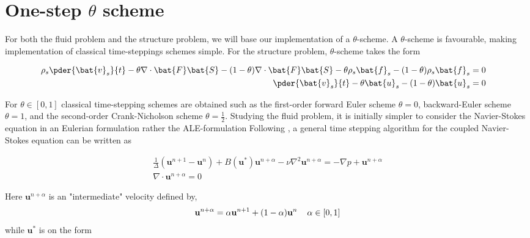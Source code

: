 \section{One-step $\theta$ scheme} 
For both the fluid problem and the structure problem, we will base our implementation of a $\theta$-scheme.  A $\theta$-scheme is favourable, making implementation of classical time-steppings schemes simple. For the structure problem,  $\theta$-scheme takes the form

\begin{align*}
\rho_s \pder{\bat{v}_s}{t} 
- \theta \nabla \cdot \bat{F}\bat{S}   - (1 - \theta) \nabla \cdot \bat{F}\bat{S}  
- \theta \rho_s \bat{f}_s 
- (1 - \theta) \rho_s \bat{f}_s = 0 \\
\pder{\bat{v}_s}{t} - \theta \bat{u}_s - (1 - \theta)\bat{u}_s  = 0&\\
\end{align*} 


For $\theta \in [0, 1]$ classical time-stepping schemes are obtained such as the first-order forward Euler scheme $\theta = 0$, backward-Euler scheme $\theta = 1$, and the second-order Crank-Nicholson scheme $\theta = \frac{1}{2}$. Studying the fluid problem, it is initially simpler to consider the Navier-Stokes equation in an Eulerian formulation rather the ALE-formulation Following \cite{Simo1994}, a general time stepping algorithm for the coupled Navier-Stokes equation can be written as


\begin{align*}
\frac{1}{\Delta}(\mathbf{u}^{n+1} - \mathbf{u}^{n}) + 
B(\mathbf{u}^{*})\mathbf{u}^{n+\alpha}
- \nu \nabla^2 \mathbf{u}^{n + \alpha} = - \nabla p + \mathbf{u}^{n+\alpha} \\
\nabla \cdot \mathbf{u}^{n+\alpha} = 0 
\end{align*} 


Here $\mathbf{u}^{n+\alpha}$ is an "intermediate" velocity defined by,
\begin{align*}
\mathbf{u}^{n+\alpha} = \alpha\mathbf{u}^{n+1} + (1 - \alpha)\mathbf{u}^{n} 
\hspace{4mm} \alpha \in [0, 1]
\end{align*}
while $\mathbf{u}^{*}$ is on the form

